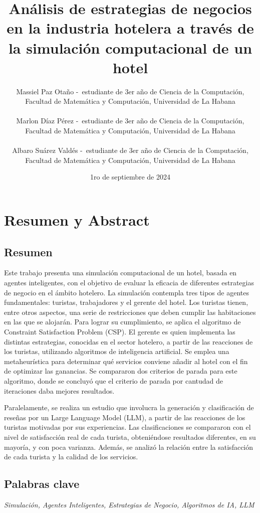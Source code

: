\documentclass[12pt,a4paper]{article} \usepackage[spanish]{babel} \usepackage{graphicx} \usepackage{amsmath} \usepackage{amsfonts} \usepackage{amssymb} \usepackage{float} \usepackage{geometry}
\title{\textbf{Análisis de estrategias de negocios en la industria hotelera a través de la simulación computacional de un hotel}}
\author{Massiel Paz Otaño -\ estudiante de 3er año de Ciencia de la Computación, \\ Facultad de Matemática y Computación, Universidad de La Habana\\\\ Marlon Díaz Pérez -\ estudiante de 3er año de Ciencia de la Computación, \\ Facultad de Matemática y Computación, Universidad de La Habana\\\\ Albaro Suárez Valdés -\ estudiante de 3er año de Ciencia de la Computación, \\ Facultad de Matemática y Computación, Universidad de La Habana} \date{1ro de septiembre de 2024}
\begin{document}
\maketitle

\vspace{-1em} \hrulefill

\section*{Resumen y Abstract}

\subsection*{Resumen} 

Este trabajo presenta una simulación computacional de un hotel, basada en agentes inteligentes, con el objetivo de evaluar la eficacia de diferentes estrategias de negocio en el ámbito hotelero. La simulación contempla tres tipos de agentes fundamentales: turistas, trabajadores y el gerente del hotel. Los turistas tienen, entre otros aspectos, una serie de restricciones que deben cumplir las habitaciones en las que se alojarán. Para lograr su cumplimiento, se aplica el algoritmo de Constraint Satisfaction Problem (CSP). El gerente es quien implementa las distintas estrategias, conocidas en el sector hotelero, a partir de las reacciones de los turistas, utilizando algoritmos de inteligencia artificial. Se emplea una metaheurística para determinar qué servicios conviene añadir al hotel con el fin de optimizar las ganancias. Se compararon dos criterios de parada para este algoritmo, donde se concluyó que el criterio de parada por cantudad de iteraciones daba mejores resultados.

Paralelamente, se realiza un estudio que involucra la generación y clasificación de reseñas por un Large Language Model (LLM), a partir de las reacciones de los turistas motivadas por sus experiencias. Las clasificaciones se compararon con el nivel de satisfacción real de cada turista, obteniéndose resultados diferentes, en su mayoría, y con poca varianza. Además, se analizó la relación entre la satisfacción de cada turista y la calidad de los servicios.

\subsection*{Palabras clave} \textit{Simulación, Agentes Inteligentes, Estrategias de Negocio, Algoritmos de IA, LLM}
\end{document}
